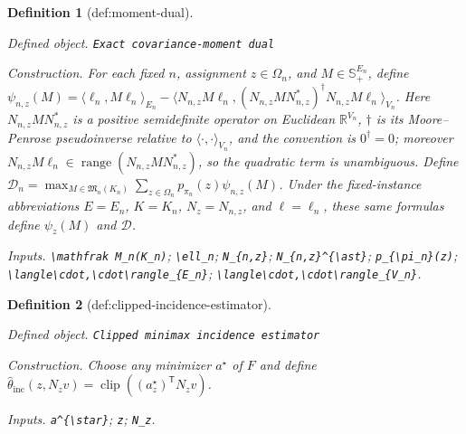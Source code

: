 \documentclass{article}
\newtheorem{definition}{Definition}
\begin{document}
\begin{definition}[def:moment-dual]\label{def:moment-dual}
\par\smallskip\noindent\emph{Defined object.} \texttt{Exact covariance-\allowbreak{}moment dual}
\par\smallskip\noindent\emph{Construction.} For each fixed \(n\), assignment \(z\in\Omega_n\), and \(M\in\mathbb S_+^{E_n}\), define \(\psi_{n,z}(M)=\langle\ell_n,M\ell_n\rangle_{E_n}-\langle N_{n,z}M\ell_n,(N_{n,z}MN_{n,z}^{\ast})^{\dagger}N_{n,z}M\ell_n\rangle_{V_n}\). Here \(N_{n,z}MN_{n,z}^{\ast}\) is a positive semidefinite operator on Euclidean \(\mathbb R^{V_n}\), \(\dagger\) is its Moore--Penrose pseudoinverse relative to \(\langle\cdot,\cdot\rangle_{V_n}\), and the convention is \(0^{\dagger}=0\); moreover \(N_{n,z}M\ell_n\in\operatorname{range}(N_{n,z}MN_{n,z}^{\ast})\), so the quadratic term is unambiguous. Define \(\mathcal D_n=\max_{M\in\mathfrak M_n(K_n)}\sum_{z\in\Omega_n}p_{\pi_n}(z)\psi_{n,z}(M)\). Under the fixed-instance abbreviations \(E=E_n\), \(K=K_n\), \(N_z=N_{n,z}\), and \(\ell=\ell_n\), these same formulas define \(\psi_z(M)\) and \(\mathcal D\).
\par\smallskip\noindent\emph{Inputs.} \texttt{\textbackslash{}\allowbreak{}mathfrak M\_\allowbreak{}n(K\_\allowbreak{}n)}; \texttt{\textbackslash{}\allowbreak{}ell\_\allowbreak{}n}; \texttt{N\_\allowbreak{}\{n,\allowbreak{}z\}\allowbreak{}}; \texttt{N\_\allowbreak{}\{n,\allowbreak{}z\}\allowbreak{}\textasciicircum{}\{\textbackslash{}\allowbreak{}ast\}\allowbreak{}}; \texttt{p\_\allowbreak{}\{\textbackslash{}\allowbreak{}pi\_\allowbreak{}n\}\allowbreak{}(z)}; \texttt{\textbackslash{}\allowbreak{}langle\textbackslash{}\allowbreak{}cdot,\allowbreak{}\textbackslash{}\allowbreak{}cdot\textbackslash{}\allowbreak{}rangle\_\allowbreak{}\{E\_\allowbreak{}n\}\allowbreak{}}; \texttt{\textbackslash{}\allowbreak{}langle\textbackslash{}\allowbreak{}cdot,\allowbreak{}\textbackslash{}\allowbreak{}cdot\textbackslash{}\allowbreak{}rangle\_\allowbreak{}\{V\_\allowbreak{}n\}\allowbreak{}}.
\end{definition}

\begin{definition}[def:clipped-incidence-estimator]\label{def:clipped-incidence-estimator}
\par\smallskip\noindent\emph{Defined object.} \texttt{Clipped minimax incidence estimator}
\par\smallskip\noindent\emph{Construction.} Choose any minimizer \(a^{\star}\) of \(F\) and define \(\widehat\theta_{\mathrm{inc}}(z,N_zv)=\operatorname{clip}((a_z^{\star})^{\mathsf T}N_zv)\).
\par\smallskip\noindent\emph{Inputs.} \texttt{a\textasciicircum{}\{\textbackslash{}\allowbreak{}star\}\allowbreak{}}; \texttt{z}; \texttt{N\_\allowbreak{}z}.
\end{definition}
\end{document}
